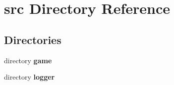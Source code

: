 \section{src Directory Reference}
\label{dir_68267d1309a1af8e8297ef4c3efbcdba}
\subsection*{Directories}
\begin{DoxyCompactItemize}
\item 
directory {\bf game}
\item 
directory {\bf logger}
\end{DoxyCompactItemize}
